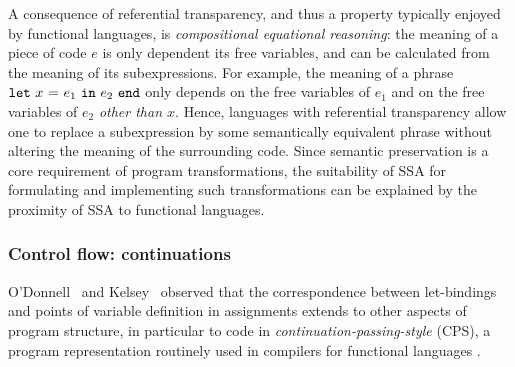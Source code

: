 A consequence of referential transparency, and thus a property
typically enjoyed by functional languages, is \emph{compositional
equational reasoning}: the meaning of a piece of code $e$ is only
dependent its free variables, and can be calculated from the meaning
of its subexpressions. For example, the meaning of a phrase $\mathtt{let}\ {x}\ \mathtt{=}\ {e_1}\ \mathtt{in}\ {e_2}\ \mathtt{end}$ only depends on the free variables of $e_1$ and on the
free variables of $e_2$ \emph{other than $x$}. Hence, languages with
referential transparency allow one to replace a subexpression by some
semantically equivalent phrase without altering the meaning of the
surrounding code. Since semantic preservation is a core requirement of
program transformations, the suitability of SSA for formulating and
implementing such transformations can be explained by the proximity of
SSA to functional languages.

\subsubsection{Control flow: continuations}
O'Donnell~\cite{ODonnellPhD} and Kelsey~\cite{Kelsey95} observed that
the correspondence between let-bindings and points of variable
definition in assignments extends to other aspects of program
structure, in particular to code in
\emph{continuation-passing-style} (CPS), a program
representation routinely used in compilers for functional languages
\cite{DBLP:journals/lisp/SussmanS98a,Appel:CWC}.


